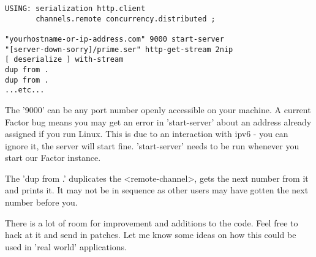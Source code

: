 \begin{verbatim}
USING: serialization http.client 
       channels.remote concurrency.distributed ;

"yourhostname-or-ip-address.com" 9000 start-server
"[server-down-sorry]/prime.ser" http-get-stream 2nip 
[ deserialize ] with-stream
dup from .
dup from .
...etc...
\end{verbatim}

The '9000' can be any port number openly accessible on your machine. A
current Factor bug means you may get an error in 'start-server' about
an address already assigned if you run Linux. This is due to an
interaction with ipv6 - you can ignore it, the server will start
fine. 'start-server' needs to be run whenever you start our Factor
instance.

The 'dup from .' duplicates the <remote-channel>, gets the next number
from it and prints it. It may not be in sequence as other users may
have gotten the next number before you.

There is a lot of room for improvement and additions to the code. Feel
free to hack at it and send in patches. Let me know some ideas on how
this could be used in 'real world' applications.  

